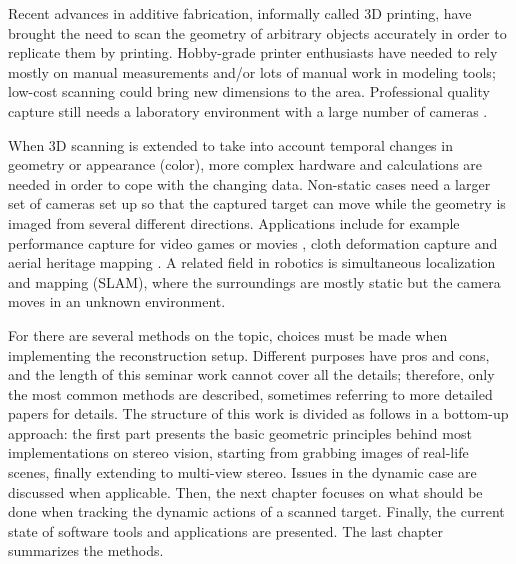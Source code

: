 Recent advances in additive fabrication, informally called 3D printing, have brought the need to scan the geometry of arbitrary objects accurately in order to replicate them by printing.
Hobby-grade printer enthusiasts have needed to rely mostly on manual measurements and/or lots of manual work in modeling tools; low-cost scanning could bring new dimensions to the area.
Professional quality capture still needs a laboratory environment with a large number of cameras \cite{winder2008technical,motionscan}.

When 3D scanning is extended to take into account temporal changes in geometry or appearance (color), more complex hardware and calculations are needed in order to cope with the changing data.
Non-static cases need a larger set of cameras set up so that the captured target can move while the geometry is imaged from several different directions.
Applications include for example performance capture for video games or movies \cite{bradley2010high}, cloth deformation capture \cite{pritchard2003cloth} and aerial heritage mapping \cite{remondino2011heritage}.
A related field in robotics is simultaneous localization and mapping (SLAM), where the surroundings are mostly static but the camera moves in an unknown environment. \cite{durrant2006simultaneous}

For there are several methods on the topic, choices must be made when implementing the reconstruction setup.
Different purposes have pros and cons, and the length of this seminar work cannot cover all the details; therefore, only the most common methods are described, sometimes referring to more detailed papers for details.
The structure of this work is divided as follows in a bottom-up approach: the first part presents the basic geometric principles behind most implementations on stereo vision, starting from grabbing images of real-life scenes, finally extending to multi-view stereo.
Issues in the dynamic case are discussed when applicable.
Then, the next chapter focuses on what should be done when tracking the dynamic actions of a scanned target.
Finally, the current state of software tools and applications are presented. The last chapter summarizes the methods.
